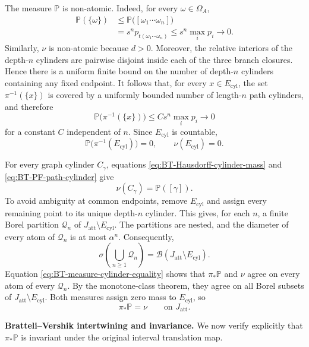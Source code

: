 \documentclass[11pt]{amsart}
\theoremstyle{plain}
\theoremstyle{definition}
\theoremstyle{remark}
\begin{document}
The measure \(\mathbb P\) is non-atomic. Indeed, for every
\(\omega\in\Omega_A\),
\[
\begin{aligned}
        \mathbb P(\{\omega\})
        &\leq
        \mathbb P
        \bigl(
        [\omega_1\cdots\omega_n]
        \bigr)\\
        &=
        s^n p_{t(\omega_1\cdots\omega_n)}
        \leq
        s^n\max_i p_i
        \longrightarrow0.
\end{aligned}
\]
Similarly, \(\nu\) is non-atomic because \(d>0\). Moreover, the relative
interiors of the depth-\(n\) cylinders are pairwise disjoint inside each
of the three branch closures. Hence there is a uniform finite bound on
the number of depth-\(n\) cylinders containing any fixed endpoint. It
follows that, for every \(x\in E_{\mathrm{cyl}}\), the set
\(\pi^{-1}(\{x\})\) is covered by a uniformly bounded number of
length-\(n\) path cylinders, and therefore
\[
        \mathbb P\bigl(\pi^{-1}(\{x\})\bigr)
        \leq
        C s^n\max_i p_i
        \longrightarrow0
\]
for a constant \(C\) independent of \(n\). Since
\(E_{\mathrm{cyl}}\) is countable,
\[
        \mathbb P\bigl(\pi^{-1}(E_{\mathrm{cyl}})\bigr)=0,
        \qquad
        \nu(E_{\mathrm{cyl}})=0.
\tag{B.6}
\label{eq:BT-endpoint-null}
\]

For every graph cylinder \(C_\gamma\), equations
\eqref{eq:BT-Hausdorff-cylinder-mass} and
\eqref{eq:BT-PF-path-cylinder} give
\[
        \nu(C_\gamma)
        =
        \mathbb P([\gamma]).
\tag{B.7}
\label{eq:BT-measure-cylinder-equality}
\]
To avoid ambiguity at common endpoints, remove
\(E_{\mathrm{cyl}}\) and assign every remaining point to its unique
depth-\(n\) cylinder. This gives, for each \(n\), a finite Borel
partition \(\mathcal Q_n\) of \(J_{\mathrm{att}}\setminus E_{\mathrm{cyl}}\). The
partitions are nested, and the diameter of every atom of \(\mathcal Q_n\)
is at most \(\alpha^n\). Consequently,
\[
        \sigma\left(
        \bigcup_{n\geq1}\mathcal Q_n
        \right)
        =
        \mathcal B(J_{\mathrm{att}}\setminus E_{\mathrm{cyl}}).
\]
Equation \eqref{eq:BT-measure-cylinder-equality} shows that
\(\pi_*\mathbb P\) and \(\nu\) agree on every atom of every
\(\mathcal Q_n\). By the monotone-class theorem, they agree on all Borel
subsets of \(J_{\mathrm{att}}\setminus E_{\mathrm{cyl}}\). Both measures assign zero
mass to \(E_{\mathrm{cyl}}\), so
\[
        \pi_*\mathbb P=\nu
        \qquad\text{on }J_{\mathrm{att}}.
\tag{B.8}
\label{eq:BT-Hausdorff-path-pushforward}
\]

\smallskip
\noindent
\textbf{Bratteli--Vershik intertwining and invariance.}
We now verify explicitly that \(\pi_*\mathbb P\) is invariant under the
original interval translation map.
\end{document}
